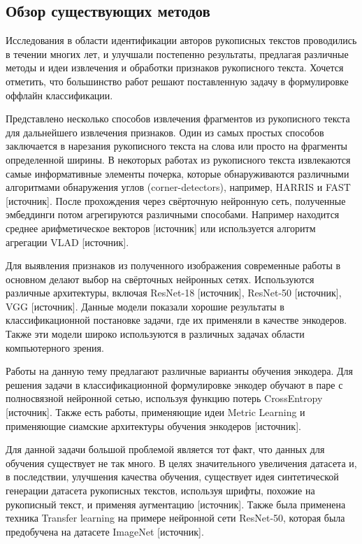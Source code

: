 \subsection{Обзор существующих методов}
    Исследования в области идентификации авторов рукописных текстов проводились в течении многих лет, и улучшали постепенно результаты, предлагая различные методы и идеи извлечения и обработки признаков рукописного текста. Хочется отметить, что большинство работ решают поставленную задачу в формулировке оффлайн классификации.
    
    Представлено несколько способов извлечения фрагментов из рукописного текста для дальнейшего извлечения признаков. Один из самых простых способов заключается в нарезания рукописного текста на слова или просто на фрагменты определенной ширины. В некоторых работах из рукописного текста извлекаются самые информативные элементы почерка, которые обнаруживаются различными алгоритмами обнаружения углов (corner-detectors), например, HARRIS и FAST [источник]. После прохождения через свёрточную нейронную сеть, полученные эмбеддинги потом агрегируются различными способами. Например находится среднее арифметическое векторов [источник] или используется алгоритм агрегации VLAD [источник]. 

    Для выявления признаков из полученного изображения современные работы в основном делают выбор на свёрточных нейронных сетях. Используются различные архитектуры, включая ResNet-18 [источник], ResNet-50 [источник], VGG [источник]. Данные модели показали хорошие результаты в классификационной постановке задачи, где их применяли в качестве энкодеров. Также эти модели широко используются в различных задачах области компьютерного зрения.

    Работы на данную тему предлагают различные варианты обучения энкодера. Для решения задачи в классификационной формулировке энкодер обучают в паре с полносвязной нейронной сетью, используя функцию потерь CrossEntropy [источник]. Также есть работы, применяющие идеи Metric Learning и применяющие сиамские архитектуры обучения энкодеров [источник].

    Для данной задачи большой проблемой является тот факт, что данных для обучения существует не так много. В целях значительного увеличения датасета и, в последствии, улучшения качества обучения, существует идея синтетической генерации датасета рукописных текстов, используя шрифты, похожие на рукописный текст, и применяя аугментацию [источник]. Также была применена техника Transfer learning на примере нейронной сети ResNet-50, которая была предобучена на датасете ImageNet [источник].

